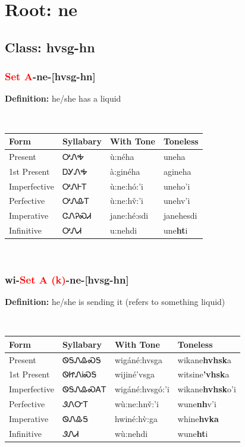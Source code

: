 \needspace{4in}
\section*{Root: ne}
\nopagebreak
{}
\needspace{3in}
\subsection*{Class: hvsg-hn}
\nopagebreak
\needspace{2in}
\subsubsection*{\textcolor{Red}{Set A}{-}\textbf{ne}{-}[hvsg-hn]}
\nopagebreak
\textbf{Definition: } he/she has a liquid
\\[0.5em]
\begin{tabularx}{\textwidth}{l X X X}%
\toprule%
\textbf{Form}&\textbf{Syllabary}&\textbf{With Tone}&\textbf{Toneless}\\%
\midrule%
Present&ᎤᏁᎭ&ù:néha&uneha\\%
1st Present&ᎠᎩᏁᎭ&à:ginéha&agineha\\%
Imperfective&ᎤᏁᎰᎢ&ù:ne:hó:’i&uneho{\textquoteright}i\\%
Perfective&ᎤᏁᎲᎢ&ù:ne:hv̌:’i&unehv{\textquoteright}i\\%
Imperative&ᏣᏁᎮᏍᏗ&jane:hé:sdi&janehesdi\\%
Infinitive&ᎤᏁᏗ&u:nehdi&une\textbf{ht}i\\%
\bottomrule%
\end{tabularx}
\\[1em]
\needspace{2in}
\subsubsection*{wi{-}\textcolor{Red}{Set A (k)}{-}\textbf{ne}{-}[hvsg-hn]}
\nopagebreak
\textbf{Definition: } he/she is sending it (refers to something liquid)
\\[0.5em]
\begin{tabularx}{\textwidth}{l X X X}%
\toprule%
\textbf{Form}&\textbf{Syllabary}&\textbf{With Tone}&\textbf{Toneless}\\%
\midrule%
Present&ᏫᎦᏁᎲᏍᎦ&wigáné:hvsga&wikane\textbf{hvhsk}a\\%
1st Present&ᏫᏥᏁᎥᏍᎦ&wijiné’vsga&witsine\textbf{'vhsk}a\\%
Imperfective&ᏫᎦᏁᎲᏍᎪᎢ&wigáné:hvsgó:’i&wikane\textbf{hvhsk}o'i\\%
Perfective&ᏭᏁᏅᎢ&wù:ne:hnv̌:’i&wune\textbf{nh}v'i\\%
Imperative&ᏫᏁᎲᎦ&hwiné:hv̀:ga&whine\textbf{hvka}\\%
Infinitive&ᏭᏁᏗ&wù:nehdi&wune\textbf{ht}i\\%
\bottomrule%
\end{tabularx}
\\[1em]
\needspace{3in}
